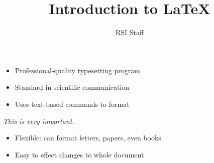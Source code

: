 \documentclass[landscape]{slides}
\title{Introduction to \LaTeX}
\author{RSI {\number\year} Staff}
\date{}
\begin{document}

\renewcommand{\labelitemii}{\labelitemi}
\renewcommand{\labelitemiv}{\labelitemi}



\begin{slide}
  \thispagestyle{empty}
  \maketitle
\end{slide}


\begin{slide}
  \begin{small}
    \tableofcontents
  \end{small}
\end{slide}

\addtocounter{slide}{-1}


\begin{slide}
\begin{itemize}
\item Professional-quality typesetting program
\item Standard in scientific communication
\item Uses text-based commands to format
\end{itemize}

\begin{example}
\emph{This is very important.}
\end{example}

\begin{itemize}
\item Flexible: can format letters, papers, even books
\item Easy to effect changes to whole document
\end{itemize}
\end{slide}
\end{document}

